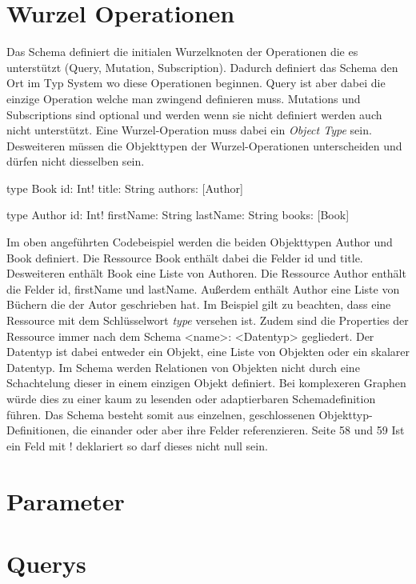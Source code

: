 \documentclass[bachelor, german ]{hgbthesis}
\begin{document}
\section{Wurzel Operationen}
Das Schema definiert die initialen Wurzelknoten der Operationen die es unterstützt (Query, Mutation, Subscription). Dadurch definiert das Schema den Ort im Typ System wo diese Operationen beginnen.
Query ist aber dabei die einzige Operation welche man zwingend definieren muss. Mutations und Subscriptions sind optional und werden wenn sie nicht definiert werden auch nicht unterstützt.
Eine Wurzel-Operation muss dabei ein \textit{Object Type} sein. Desweiteren müssen die Objekttypen der Wurzel-Operationen unterscheiden und dürfen nicht diesselben sein. 


\begin{JsCode}
type Book {
    id: Int!
    title: String
    authors: [Author]
}
    
type Author {
    id: Int!
    firstName: String
    lastName: String
    books: [Book]
}
\end{JsCode}

Im oben angeführten Codebeispiel werden die beiden Objekttypen Author und Book definiert.
Die Ressource Book enthält dabei die Felder id und title. Desweiteren enthält Book eine Liste von Authoren.
Die Ressource Author enthält die Felder id, firstName und lastName.
Außerdem enthält Author eine Liste von Büchern die der Autor geschrieben hat.
Im Beispiel gilt zu beachten, dass eine Ressource mit dem Schlüsselwort \textit{type} versehen ist.
Zudem sind die Properties der Ressource immer nach dem Schema <name>: <Datentyp> gegliedert.
Der Datentyp ist dabei entweder ein Objekt, eine Liste von Objekten oder ein skalarer Datentyp.
Im Schema werden Relationen von Objekten nicht durch eine Schachtelung dieser in einem einzigen Objekt definiert.
Bei komplexeren Graphen würde dies zu einer kaum zu lesenden oder adaptierbaren Schemadefinition führen.
Das Schema besteht somit aus einzelnen, geschlossenen Objekttyp-Definitionen, die einander oder aber ihre Felder referenzieren. Seite 58 und 59
Ist ein Feld mit ! deklariert so darf dieses nicht null sein.


\section{Parameter}

\section{Querys}
\end{document}
